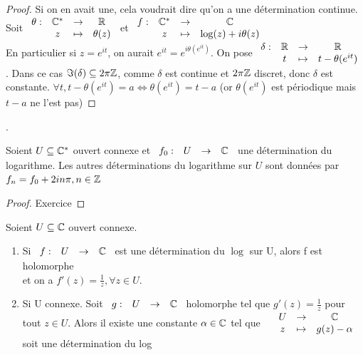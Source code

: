 \documentclass[]{report}
\begin{document}
\begin{proof}
    Si on en avait une, cela voudrait dire qu'on a une détermination continue.\\ Soit $\begin{array}{ccccc}
\theta : & \mathbb{C}^* & \to & \mathbb{R} \\
  & z & \mapsto & \theta(z)  
\end{array}$ et $\begin{array}{ccccc}
f : & \mathbb{C}^* & \to & \mathbb{C} \\
  & z & \mapsto & \log(z)+i\theta(z)  
\end{array}$\\
En particulier si $z=e^{it}$, on aurait $e^{it}=e^{i\theta(e^{it})}$.
On pose $\begin{array}{ccccc}
\delta : & \mathbb{R} & \to & \mathbb{R} \\
  & t & \mapsto & t-\theta(e^{it})  
\end{array}$. Dans ce cas $\Im(\delta)\subseteq2\pi\mathbb{Z}$, comme $\delta$ est continue et $2\pi\mathbb{Z}$ discret, donc $\delta$ est constante. $\forall t, t-\theta(e^{it})=a\iff \theta(e^{it})=t-a$ (or $\theta(e^{it})$ est périodique mais $t-a$ ne l'est pas)
\end{proof}. 

\begin{prop}
    Soient $U\subseteq \mathbb{C}^*$ ouvert connexe et $\begin{array}{ccccc}
f_0 : & U & \to & \mathbb{C} \\ 
\end{array}$ une détermination du logarithme. Les autres déterminations du logarithme sur $U$ sont données par $f_n=f_0+2in\pi,n\in\mathbb{Z}$
\end{prop}

\begin{proof}
    Exercice
\end{proof}

\begin{prop}
    Soient $U\subseteq\mathbb{C}$ ouvert connexe. \begin{enumerate}
        \item Si $\begin{array}{ccccc}
f : & U & \to & \mathbb{C}
\end{array}$ est une détermination du $\log$ sur U, alors f est holomorphe \\et on a $f'(z)=\frac{1}{z},\forall z\in U$.
    \item Si U connexe. Soit $\begin{array}{ccccc}
g : & U & \to & \mathbb{C}
\end{array}$ holomorphe tel que $g'(z)=\frac{1}{z}$ pour tout $z\in U$. Alors il existe une constante $\alpha\in\mathbb{C}$ tel que $\begin{array}{ccccc}
& U & \to & \mathbb{C} \\
& z & \mapsto & g(z)-\alpha  
\end{array}$ soit une détermination du log
    \end{enumerate}
\end{prop}
\end{document}
